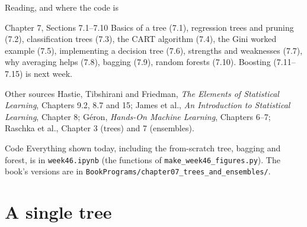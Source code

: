 \documentclass[10pt,aspectratio=169]{beamer}
\begin{document}
\begin{frame}{Reading, and where the code is}
\small
\begin{block}{Chapter 7, Sections 7.1--7.10}
Basics of a tree (7.1), regression trees and pruning (7.2), classification
trees (7.3), the CART algorithm (7.4), the Gini worked example (7.5),
implementing a decision tree (7.6), strengths and weaknesses (7.7), why
averaging helps (7.8), bagging (7.9), random forests (7.10).  Boosting
(7.11--7.15) is next week.
\end{block}
\begin{block}{Other sources}
Hastie, Tibshirani and Friedman, \emph{The Elements of Statistical Learning},
Chapters 9.2, 8.7 and 15; James et al., \emph{An Introduction to Statistical
Learning}, Chapter 8; G\'eron, \emph{Hands-On Machine Learning}, Chapters 6--7;
Raschka et al., Chapter 3 (trees) and 7 (ensembles).
\end{block}
\begin{block}{Code}
Everything shown today, including the from-scratch tree, bagging and forest,
is in \texttt{week46.ipynb} (the functions of
\texttt{make\_week46\_figures.py}).  The book's versions are in
\texttt{BookPrograms/chapter07\_trees\_and\_ensembles/}.
\end{block}
\end{frame}

\section{A single tree}
\end{document}
